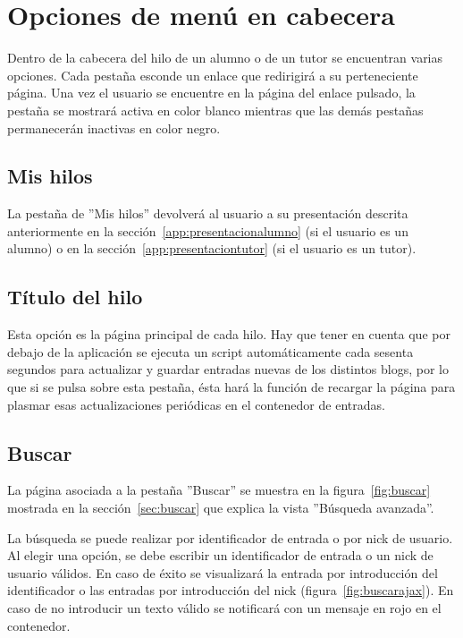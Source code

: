 \documentclass[a4paper, 12pt]{book}
\begin{document}
\section{Opciones de men\'u en cabecera}
Dentro de la cabecera del hilo de un alumno o de un tutor se encuentran varias opciones. Cada pesta\~na esconde un enlace que redirigir\'a a su 
perteneciente p\'agina. Una vez el usuario se encuentre en la p\'agina del enlace pulsado, la pesta\~na se mostrar\'a activa en color blanco mientras que 
las dem\'as pesta\~nas permanecer\'an inactivas en color negro.

\subsection{Mis hilos}
La pesta\~na de ''Mis hilos'' devolver\'a al usuario a su presentaci\'on descrita anteriormente en la secci\'on~\ref{app:presentacionalumno} (si el usuario
es un alumno) o en la secci\'on~\ref{app:presentaciontutor} (si el usuario es un tutor).

\subsection{T\'itulo del hilo}
Esta opci\'on es la p\'agina principal de cada hilo. Hay que tener en cuenta que por debajo de la aplicaci\'on se ejecuta un script autom\'aticamente cada 
sesenta segundos para actualizar y guardar entradas nuevas de los distintos blogs, por lo que si se pulsa sobre esta pesta\~na, \'esta har\'a la funci\'on 
de recargar la p\'agina para plasmar esas actualizaciones peri\'odicas en el contenedor de entradas.

\subsection{Buscar}
La p\'agina asociada a la pesta\~na ''Buscar'' se muestra en la figura~\ref{fig:buscar} mostrada en la secci\'on~\ref{sec:buscar} que explica la 
vista ''B\'usqueda avanzada''.

La b\'usqueda se puede realizar por identificador de entrada o por nick de usuario. Al elegir una opci\'on, se debe escribir un identificador de entrada o 
un nick de usuario v\'alidos. En caso de \'exito se visualizar\'a la entrada por introducci\'on del identificador o las entradas por introducci\'on del nick
(figura~\ref{fig:buscarajax}). En caso de no introducir un texto v\'alido se notificar\'a con un mensaje en rojo en el contenedor.
\end{document}

